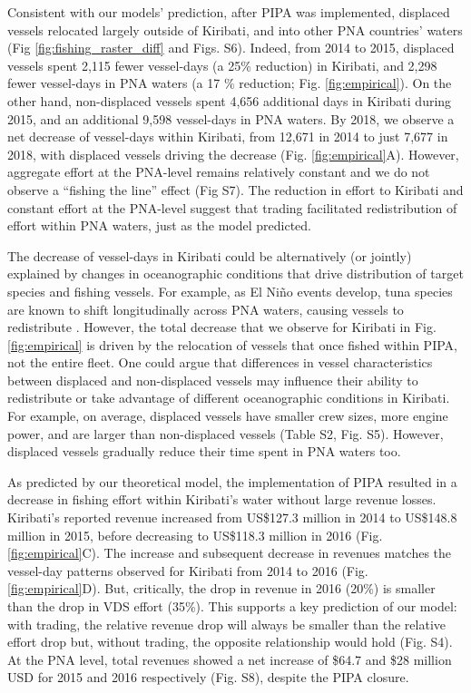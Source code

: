\documentclass[12pt]{article}
\begin{document}
Consistent with our models' prediction, after PIPA was implemented, displaced vessels relocated largely outside of Kiribati, and into other PNA countries' waters (Fig \ref{fig:fishing_raster_diff} and Figs. S6). Indeed, from 2014 to 2015, displaced vessels spent 2,115 fewer vessel-days (a 25\% reduction) in Kiribati, and 2,298 fewer vessel-days in PNA waters (a 17 \% reduction; Fig. \ref{fig:empirical}). On the other hand, non-displaced vessels spent 4,656 additional days in Kiribati during 2015, and an additional 9,598 vessel-days in PNA waters. By 2018, we observe a net decrease of vessel-days within Kiribati, from 12,671 in 2014 to just 7,677 in 2018, with displaced vessels driving the decrease (Fig. \ref{fig:empirical}A). However, aggregate effort at the PNA-level remains relatively constant and we do not observe a ``fishing the line'' effect (Fig S7). The reduction in effort to Kiribati and constant effort at the PNA-level suggest that trading facilitated redistribution of effort within PNA waters, just as the model predicted.

The decrease of vessel-days in Kiribati could be alternatively (or jointly) explained by changes in oceanographic conditions that drive distribution of target species and fishing vessels. For example, as El Niño events develop, tuna species are known to shift longitudinally across PNA waters, causing vessels to redistribute \cite{aqorau_2018,hanich2018unraveling}. However, the total decrease that we observe for Kiribati in Fig. \ref{fig:empirical} is driven by the relocation of vessels that once fished within PIPA, not the entire fleet. One could argue that differences in vessel characteristics between displaced and non-displaced vessels may influence their ability to redistribute or take advantage of different oceanographic conditions in Kiribati. For example, on average, displaced vessels have smaller crew sizes, more engine power, and are larger than non-displaced vessels (Table S2, Fig. S5). However, displaced vessels gradually reduce their time spent in PNA waters too.

As predicted by our theoretical model, the implementation of PIPA resulted in a decrease in fishing effort within Kiribati's water without large revenue losses. Kiribati's reported revenue increased from US\$127.3 million in 2014 to US\$148.8 million in 2015, before decreasing to US\$118.3 million in 2016 (Fig. \ref{fig:empirical}C). The increase and subsequent decrease in revenues matches the vessel-day patterns observed for Kiribati from 2014 to 2016 (Fig. \ref{fig:empirical}D). But, critically, the drop in revenue in 2016 (20\%) is smaller than the drop in VDS effort (35\%). This supports a key prediction of our model: with trading, the relative revenue drop will always be smaller than the relative effort drop but, without trading, the opposite relationship would hold (Fig. S4). At the PNA level, total revenues showed a net increase of \$64.7 and \$28 million USD for 2015 and 2016 respectively (Fig. S8), despite the PIPA closure.
\end{document}
